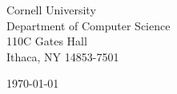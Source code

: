 \begin{minipage}{0.49\textwidth}
\begin{flushleft}
\noindent
Cornell University\\
Department of Computer Science\\
110C Gates Hall\\
Ithaca, NY 14853-7501
\end{flushleft}
\end{minipage}
\begin{minipage}{0.47\textwidth}
\begin{flushright}
\today
\end{flushright}
\end{minipage} \\

\newcommand{\univ}{Cornell University}
\newcommand{\univshort}{Cornell}
\newcommand{\degree}{Ph.D.}
\newcommand{\dept}{Computer Science}


